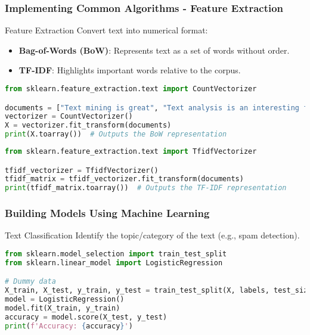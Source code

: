 \documentclass[aspectratio=169]{beamer}
\begin{document}
\begin{frame}[fragile]
    \frametitle{Implementing Common Algorithms - Feature Extraction}
    \begin{block}{Feature Extraction}
        Convert text into numerical format:
        \begin{itemize}
            \item \textbf{Bag-of-Words (BoW)}: Represents text as a set of words without order.
            \item \textbf{TF-IDF}: Highlights important words relative to the corpus.
        \end{itemize}
    \end{block}

    \begin{lstlisting}[language=Python]
from sklearn.feature_extraction.text import CountVectorizer

documents = ["Text mining is great", "Text analysis is an interesting field"]
vectorizer = CountVectorizer()
X = vectorizer.fit_transform(documents)
print(X.toarray())  # Outputs the BoW representation
    \end{lstlisting}

    \begin{lstlisting}[language=Python]
from sklearn.feature_extraction.text import TfidfVectorizer

tfidf_vectorizer = TfidfVectorizer()
tfidf_matrix = tfidf_vectorizer.fit_transform(documents)
print(tfidf_matrix.toarray())  # Outputs the TF-IDF representation
    \end{lstlisting}
\end{frame}

\begin{frame}[fragile]
    \frametitle{Building Models Using Machine Learning}
    \begin{block}{Text Classification}
        Identify the topic/category of the text (e.g., spam detection).
    \end{block}

    \begin{lstlisting}[language=Python]
from sklearn.model_selection import train_test_split
from sklearn.linear_model import LogisticRegression

# Dummy data
X_train, X_test, y_train, y_test = train_test_split(X, labels, test_size=0.2)
model = LogisticRegression()
model.fit(X_train, y_train)
accuracy = model.score(X_test, y_test)
print(f'Accuracy: {accuracy}')
    \end{lstlisting}
\end{frame}
\end{document}

